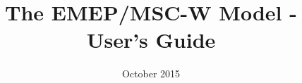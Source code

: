 \documentclass[a4paper,12pt]{report}
\begin{document}

\title{The EMEP/MSC-W Model - User's Guide}
\date{October 2015}
\maketitle

\tableofcontents
\setcounter{page}{0}







%
%
%
%
%
%
%
%
%
%
%
%

\end{document}

